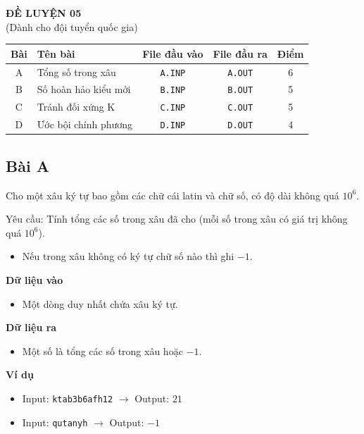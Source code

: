 \begin{center}
    {\LARGE \textbf{ĐỀ LUYỆN 05}}\\[6pt]
    {\large (Dành cho đội tuyển quốc gia)}
\end{center}

\begin{tabularx}{\textwidth}{|c|X|c|c|c|}
\hline
\textbf{Bài} & \textbf{Tên bài} & \textbf{File đầu vào} & \textbf{File đầu ra} & \textbf{Điểm} \\
\hline
A & Tổng số trong xâu & \texttt{A.INP} & \texttt{A.OUT} & 6 \\
\hline
B & Số hoàn hảo kiểu mới & \texttt{B.INP} & \texttt{B.OUT} & 5 \\
\hline
C & Tránh đối xứng K & \texttt{C.INP} & \texttt{C.OUT} & 5 \\
\hline
D & Ước bội chính phương & \texttt{D.INP} & \texttt{D.OUT} & 4 \\
\hline
\end{tabularx}

\subsection*{Bài A}

Cho một xâu ký tự bao gồm các chữ cái latin và chữ số, có độ dài không quá $10^6$.

Yêu cầu: Tính tổng các số trong xâu đã cho (mỗi số trong xâu có giá trị không quá $10^6$).

\begin{itemize}
    \item Nếu trong xâu không có ký tự chữ số nào thì ghi $-1$.
\end{itemize}

\textbf{Dữ liệu vào}
\begin{itemize}
    \item Một dòng duy nhất chứa xâu ký tự.
\end{itemize}

\textbf{Dữ liệu ra}
\begin{itemize}
    \item Một số là tổng các số trong xâu hoặc $-1$.
\end{itemize}

\textbf{Ví dụ}
\begin{itemize}
    \item Input: \texttt{ktab3b6afh12} $\rightarrow$ Output: $21$
    \item Input: \texttt{qutanyh} $\rightarrow$ Output: $-1$
\end{itemize}

